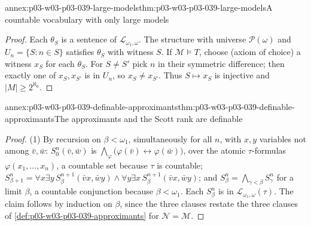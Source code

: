 \begin{annexitem}{annex:p03-w03-p03-039-large-models}{thm:p03-w03-p03-039-large-models}{A countable vocabulary with only large models}
\begin{proof}
Each \(\theta_S\) is a sentence of \(\mathcal L_{\omega_1,\omega}\). The
structure with universe \(\mathcal P(\omega)\) and
\(U_n=\{S:n\in S\}\) satisfies \(\theta_S\) with witness \(S\). If
\(\mathcal M\models T\), choose (axiom of choice) a witness \(x_S\) for each
\(\theta_S\). For \(S\ne S'\) pick \(n\) in their symmetric difference; then
exactly one of \(x_S,x_{S'}\) is in \(U_n\), so \(x_S\ne x_{S'}\). Thus
\(S\mapsto x_S\) is injective and \(\lvert M\rvert\ge2^{\aleph_0}\).
\end{proof}
\end{annexitem}

\begin{annexitem}{annex:p03-w03-p03-039-definable-approximants}{thm:p03-w03-p03-039-definable-approximants}{The approximants and the Scott rank are definable}
\begin{proof}
(1) By recursion on \(\beta<\omega_1\), simultaneously for all \(n\), with
\(x,y\) variables not among \(\bar v,\bar w\): \(S^n_0(\bar v,\bar w)\) is
\(\bigwedge_\varphi\bigl(\varphi(\bar v)\leftrightarrow\varphi(\bar w)\bigr)\),
over the atomic \(\tau\)-formulas \(\varphi(x_1,\dots,x_n)\), a countable set
because \(\tau\) is countable;
\(S^n_{\beta+1}=\forall x\exists y\,S^{n+1}_\beta(\bar vx,\bar wy)\wedge\forall y\exists x\,S^{n+1}_\beta(\bar vx,\bar wy)\);
and \(S^n_\beta=\bigwedge_{\gamma<\beta}S^n_\gamma\) for a limit \(\beta\), a
countable conjunction because \(\beta<\omega_1\). Each \(S^n_\beta\) is in
\(\mathcal L_{\omega_1,\omega}(\tau)\). The claim follows by induction on
\(\beta\), since the three clauses restate the three clauses of
\cref{def:p03-w03-p03-039-approximants} for \(\mathcal N=\mathcal M\).


\end{proof}
\end{annexitem}
